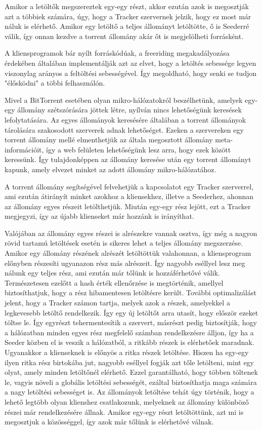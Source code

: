 \documentclass[a4paper]{article}
\begin{document}
Amikor a letöltők megszereztek egy-egy részt, akkor ezután azok is megosztják azt a többiek számára, úgy, hogy a Tracker szervernek jelzik, hogy ez most már náluk is elérhető. Amikor egy letöltő a teljes állományt letöltötte, ő is Seederré válik, így onnan kezdve a torrent állomány akár őt is megjelölheti forrásként.

A kliensprogramok bár nyílt forráskódúak, a freeriding megakadályozása érdekében általában implementálják azt az elvet, hogy a letöltés sebessége legyen viszonylag arányos a feltöltési sebességével. Így megoldható, hogy senki se tudjon "élősködni" a többi felhasználón.

Mivel a BitTorrent esetében olyan mikro-hálózatokról beszélhetünk, amelyek egy-egy állomány szétszórására jöttek létre, nyílván nincs lehetőségünk keresések lefolytatására. Az egyes állományok keresésére általában a torrent állományok tárolására szakosodott szerverek adnak lehetőséget. Ezeken a szervereken egy torrent állomány mellé elmenthetjük az általa megosztott állomány meta-információit, így a web felületen lehetőségünk lesz arra, hogy ezek között keressünk. Így tulajdonképpen az állomány keresése után egy torrent állományt kapunk, amely elvezet minket az adott állomány mikro-hálózatához.

A torrent állomány segítségével felvehetjük a kapcsolatot egy Tracker szerverrel, ami ezután átirányít minket azokhoz a kliensekhez, illetve a Seederhez, ahonnan az állomány egyes részeit letölthetjük. Miután egy-egy rész lejött, ezt a Tracker megjegyzi, így az újabb klienseket már hozzánk is irányíthat.

Valójában az állomány egyes részei is alrészekre vannak osztva, így még a nagyon rövid tartamú letöltések esetén is sikeres lehet a teljes állomány megszerzése. Amikor egy állomány részének alrészét letöltöttük valahonnan, a kliensprogram előnyben részesíti ugyanazon rész más alrészeit. Így nagyobb eséllyel lesz meg nálunk egy teljes rész, ami ezután már tőlünk is hozzáférhetővé válik. Természetesen ezelőtt a hash érték ellenőrzése is megtörténik, amellyel biztosíthatjuk, hogy a rész hibamentesen letöltésre került. További optimalizálást jelent, hogy a Tracker számon tartja, melyek azok a részek, amelyekkel a legkevesebb letöltő rendelkezik. Így egy új letöltőt arra utasít, hogy először ezeket töltse le. Így egyrészt tehermentesítik a szervert, másrészt pedig biztosítják, hogy a hálózatban minden egyes rész megfelelő számban rendelkezésre álljon, így ha a Seeder közben el is veszik a hálózatból, a ritkább részek is elérhetőek maradnak. Ugyanakkor a klienseknek is előnyös a ritka részek letöltése. Hiszen ha egy-egy ilyen ritka rész birtokába jut, nagyobb eséllyel fogják azt tőle letölteni, mint egy olyat, amely minden letöltőnél elérhető. Ezzel garantálható, hogy többen töltenek le, vagyis növeli a globális letöltési sebességét, ezáltal biztosíthatja maga számára a nagy letöltési sebességet is. Az állományok letöltése tehát úgy történik, hogy a lehető legtöbb olyan klienshez csatlakozunk, melyeknek az állomány különböző részei már rendelkezésére állnak. Amikor egy-egy részt letöltöttünk, azt mi is megosztjuk a közösséggel, így azok már tőlünk is elérhetővé válnak.
\end{document}
